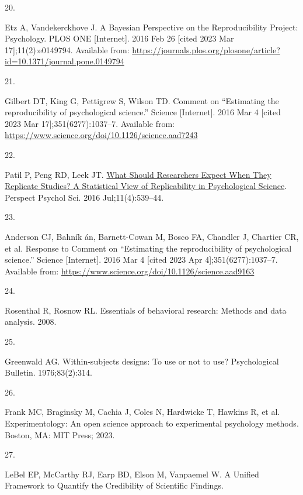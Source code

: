 \documentclass[
  english,
  a4paper,
]{article}
\newlength{\cslhangindent}
\newlength{\csllabelwidth}
\newlength{\cslentryspacingunit} %
\newenvironment{CSLReferences}[2] %
 {%
  \setlength{\parindent}{0pt}
  \ifodd #1
  \let\oldpar\par
  \def\par{\hangindent=\cslhangindent\oldpar}
  \fi
  \setlength{\parskip}{#2\cslentryspacingunit}
 }%
 {}
\newcommand{\CSLLeftMargin}[1]{\parbox[t]{\csllabelwidth}{#1}}
\newcommand{\CSLRightInline}[1]{\parbox[t]{\linewidth - \csllabelwidth}{#1}\break}
\begin{document}
\begin{CSLReferences}{0}{0}
\leavevmode{}%
\CSLLeftMargin{20. }%
\CSLRightInline{Etz A, Vandekerckhove J. A {Bayesian Perspective} on the {Reproducibility Project}: {Psychology}. PLOS ONE {[}Internet{]}. 2016 Feb 26 {[}cited 2023 Mar 17{]};11(2):e0149794. Available from: \url{https://journals.plos.org/plosone/article?id=10.1371/journal.pone.0149794}}

\leavevmode{}%
\CSLLeftMargin{21. }%
\CSLRightInline{Gilbert DT, King G, Pettigrew S, Wilson TD. Comment on {``{Estimating} the reproducibility of psychological science.''} Science {[}Internet{]}. 2016 Mar 4 {[}cited 2023 Mar 17{]};351(6277):1037--7. Available from: \url{https://www.science.org/doi/10.1126/science.aad7243}}

\leavevmode{}%
\CSLLeftMargin{22. }%
\CSLRightInline{Patil P, Peng RD, Leek JT. \href{https://doi.org/10.1177/1745691616646366}{What {Should Researchers Expect When They Replicate Studies}? {A Statistical View} of {Replicability} in {Psychological Science}}. Perspect Psychol Sci. 2016 Jul;11(4):539--44. }

\leavevmode{}%
\CSLLeftMargin{23. }%
\CSLRightInline{Anderson CJ, Bahník án, Barnett-Cowan M, Bosco FA, Chandler J, Chartier CR, et al. Response to {Comment} on {``{Estimating} the reproducibility of psychological science.''} Science {[}Internet{]}. 2016 Mar 4 {[}cited 2023 Apr 4{]};351(6277):1037--7. Available from: \url{https://www.science.org/doi/10.1126/science.aad9163}}

\leavevmode{}%
\CSLLeftMargin{24. }%
\CSLRightInline{Rosenthal R, Rosnow RL. Essentials of behavioral research: Methods and data analysis. 2008. }

\leavevmode{}%
\CSLLeftMargin{25. }%
\CSLRightInline{Greenwald AG. Within-subjects designs: To use or not to use? Psychological Bulletin. 1976;83(2):314. }

\leavevmode{}%
\CSLLeftMargin{26. }%
\CSLRightInline{Frank MC, Braginsky M, Cachia J, Coles N, Hardwicke T, Hawkins R, et al. Experimentology: An open science approach to experimental psychology methods. Boston, MA: MIT Press; 2023. }

\leavevmode{}%
\CSLLeftMargin{27. }%
\CSLRightInline{LeBel EP, McCarthy RJ, Earp BD, Elson M, Vanpaemel W. A {Unified Framework} to {Quantify} the {Credibility} of {Scientific Findings}. }


\end{CSLReferences}
\end{document}
